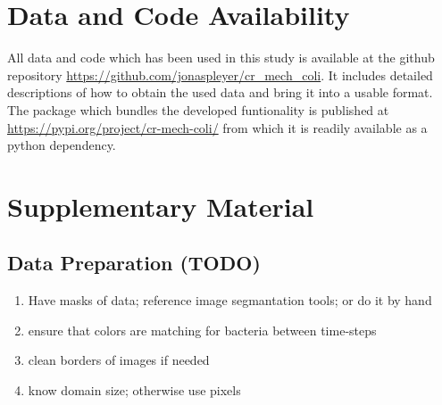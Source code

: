 \documentclass{article}
\begin{document}
% 

\section{Data and Code Availability}
All data and code which has been used in this study is available at the github repository
\url{https://github.com/jonaspleyer/cr\_mech\_coli}.
It includes detailed descriptions of how to obtain the used data and bring it into a usable format.
The package which bundles the developed funtionality is published at
\url{https://pypi.org/project/cr-mech-coli/} from which it is readily available as a python
dependency.




\appendix
\renewcommand{\thesection}{}
\renewcommand{\thesubsection}{S\arabic{subsection}}
\section{Supplementary Material}

\subsection{Data Preparation (TODO)}
\begin{enumerate}
    \item Have masks of data; reference image segmantation tools; or do it by hand
    \item ensure that colors are matching for bacteria between time-steps
    \item clean borders of images if needed
    \item know domain size; otherwise use pixels
\end{enumerate}
\end{document}
